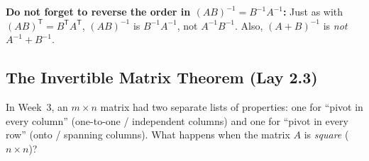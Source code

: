 \documentclass[10pt]{scrartcl}
\begin{document}
\begin{trapbox}
  \ii \textbf{Do not forget to reverse the order in $(AB)^{-1}=B^{-1}A^{-1}$:} Just as with $(AB)^{\mathsf T}=B^{\mathsf T}A^{\mathsf T}$, $(AB)^{-1}$ is $B^{-1}A^{-1}$, not $A^{-1}B^{-1}$. Also, $(A+B)^{-1}$ is \emph{not} $A^{-1}+B^{-1}$.
\end{trapbox}

\subsection{The Invertible Matrix Theorem (Lay 2.3)}

\begin{qbox}
  In Week~3, an $m\times n$ matrix had two separate lists of properties: one for ``pivot in every column'' (one-to-one / independent columns) and one for ``pivot in every row'' (onto / spanning columns). What happens when the matrix $A$ is \emph{square} ($n\times n$)?
\end{qbox}
\end{document}
